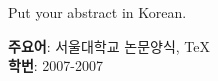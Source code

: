 \documentclass[master,korean]{snuee}
\begin{document}
%
    \begin{summary}
    \par    %
    Put your abstract in Korean.
    \vfill
    \begin{minipage}[t][20mm][b]{\textwidth}
    {\bfseries 주요어}: 서울대학교 논문양식, TeX\\
    {\bfseries 학번}: 2007-2007\\
    \end{minipage}
    \end{summary}
\end{document}
